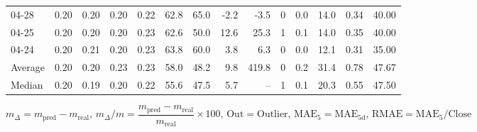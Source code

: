 \begin{threeparttable}
{\begin{tabular}{lrrrrrrrrrrrrr}
  04-28 &          0.20 &          0.20 &          0.20 &        0.22 &                62.8 &                65.0 &       -2.2 &         -3.5 &              0 &                 0.0 &             14.0 &            0.34 &                  40.00 \\
  04-25 &          0.20 &          0.20 &          0.20 &        0.23 &                62.6 &                50.0 &       12.6 &         25.3 &              1 &                 0.1 &             14.0 &            0.35 &                  40.00 \\
  04-24 &          0.20 &          0.21 &          0.20 &        0.23 &                63.8 &                60.0 &        3.8 &          6.3 &              0 &                 0.0 &             12.1 &            0.31 &                  35.00 \\
Average &          0.20 &          0.20 &          0.23 &        0.23 &                58.0 &                48.2 &        9.8 &        419.8 &              0 &                 0.2 &             31.4 &            0.78 &                  47.67 \\
 Median &          0.20 &          0.19 &          0.20 &        0.22 &                55.6 &                47.5 &        5.7 &           -- &              1 &                 0.1 &             20.3 &            0.55 &                  47.50 \\
\bottomrule
\end{tabular}
}
\begin{tablenotes}\footnotesize
\item $m_\Delta=m_{\text{pred}}-m_{\text{real}}$,
$m_\Delta/m=\dfrac{m_{\text{pred}}-m_{\text{real}}}{m_{\text{real}}}\times100$,
$\mathrm{Out}=\text{Outlier}$,
$\mathrm{MAE}_5=\mathrm{MAE}_{5\text{d}}$,
$\mathrm{RMAE}=\mathrm{MAE}_5/\text{Close}$
\end{tablenotes}
\end{threeparttable}
\endgroup

